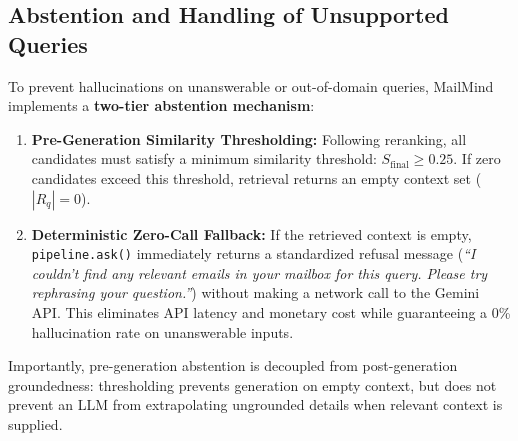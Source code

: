 \documentclass[11pt,a4paper]{article}
\begin{document}
\subsection{Abstention and Handling of Unsupported Queries}
To prevent hallucinations on unanswerable or out-of-domain queries, MailMind implements a \textbf{two-tier abstention mechanism}:
\begin{enumerate}
    \item \textbf{Pre-Generation Similarity Thresholding:} Following reranking, all candidates must satisfy a minimum similarity threshold: $S_{\text{final}} \ge 0.25$. If zero candidates exceed this threshold, retrieval returns an empty context set ($|R_q| = 0$).
    \item \textbf{Deterministic Zero-Call Fallback:} If the retrieved context is empty, \texttt{pipeline.ask()} immediately returns a standardized refusal message (\textit{``I couldn't find any relevant emails in your mailbox for this query. Please try rephrasing your question.''}) without making a network call to the Gemini API. This eliminates API latency and monetary cost while guaranteeing a 0\% hallucination rate on unanswerable inputs.
\end{enumerate}
Importantly, pre-generation abstention is decoupled from post-generation groundedness: thresholding prevents generation on empty context, but does not prevent an LLM from extrapolating ungrounded details when relevant context is supplied.
\end{document}
